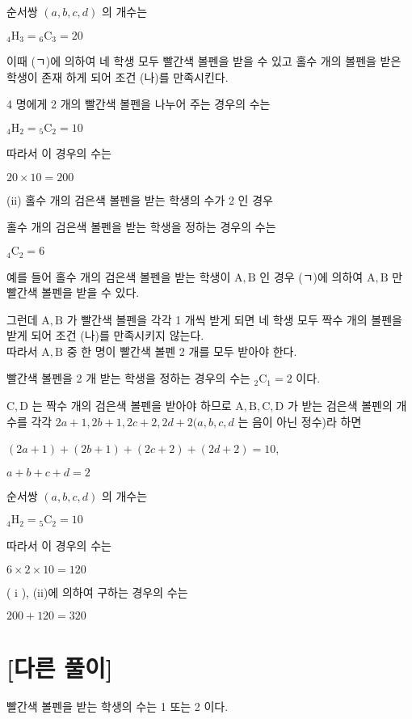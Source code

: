 \documentclass[10pt]{article}
\begin{document}
순서쌍 $(a, b, c, d)$ 의 개수는

${ }_{4} \mathrm{H}_{3}={ }_{6} \mathrm{C}_{3}=20$

이때 (ㄱ)에 의하여 네 학생 모두 빨간색 볼펜을 받을 수 있고 홀수 개의 볼펜을 받은 학생이 존재 하게 되어 조건 (나)를 만족시킨다.

4 명에게 2 개의 빨간색 볼펜을 나누어 주는 경우의 수는

${ }_{4} \mathrm{H}_{2}={ }_{5} \mathrm{C}_{2}=10$

따라서 이 경우의 수는

$20 \times 10=200$

(ii) 홀수 개의 검은색 볼펜을 받는 학생의 수가 2 인 경우

홀수 개의 검은색 볼펜을 받는 학생을 정하는 경우의 수는

${ }_{4} \mathrm{C}_{2}=6$

예를 들어 홀수 개의 검은색 볼펜을 받는 학생이 $\mathrm{A}, \mathrm{B}$ 인 경우 (ㄱ)에 의하여 $\mathrm{A}, \mathrm{B}$ 만 빨간색 볼펜을 받을 수 있다.

그런데 $\mathrm{A}, \mathrm{B}$ 가 빨간색 볼펜을 각각 1 개씩 받게 되면 네 학생 모두 짝수 개의 볼펜을 받게 되어 조건 (나)를 만족시키지 않는다.\\
따라서 $\mathrm{A}, \mathrm{B}$ 중 한 명이 빨간색 볼펜 2 개를 모두 받아야 한다.

빨간색 볼펜을 2 개 받는 학생을 정하는 경우의 수는 ${ }_{2} \mathrm{C}_{1}=2$ 이다.

$\mathrm{C}, \mathrm{D}$ 는 짝수 개의 검은색 볼펜을 받아야 하므로 $\mathrm{A}, \mathrm{B}, \mathrm{C}, \mathrm{D}$ 가 받는 검은색 볼펜의 개수를 각각 $2 a+1,2 b+1,2 c+2,2 d+2(a, b, c, d$ 는 음이 아닌 정수)라 하면

$(2 a+1)+(2 b+1)+(2 c+2)+(2 d+2)=10$,

$a+b+c+d=2$

순서쌍 $(a, b, c, d)$ 의 개수는

${ }_{4} \mathrm{H}_{2}={ }_{5} \mathrm{C}_{2}=10$

따라서 이 경우의 수는

$6 \times 2 \times 10=120$

( i ), (ii)에 의하여 구하는 경우의 수는

$200+120=320$

\section*{[다른 풀이]}
빨간색 볼펜을 받는 학생의 수는 1 또는 2 이다.
\end{document}
